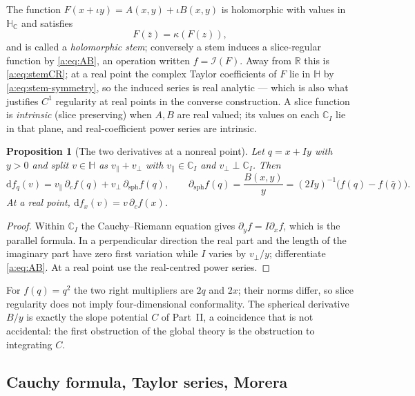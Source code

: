 \documentclass[11pt,a4paper]{article}
\numberwithin{equation}{section}
\newtheorem{proposition}[theorem]{Proposition}
\theoremstyle{definition}
\theoremstyle{remark}
\theoremstyle{plain}
\newcommand{\HH}{\mathbb H}
\newcommand{\HC}{\mathbb H_{\mathbb C}}
\newcommand{\RR}{\mathbb R}
\newcommand{\CC}{\mathbb C}
\newcommand{\I}{\mathcal I}
\newcommand{\pot}{C}          %
\newcommand{\dd}{\mathrm d}
\begin{document}
The function $F(x+\iota y)=A(x,y)+\iota B(x,y)$ is holomorphic with values in
$\HC$ and satisfies
\begin{equation}
 F(\bar z)=\kappa(F(z)),
 \label{a:eq:stem-symmetry}
\end{equation}
and is called a \emph{holomorphic stem}; conversely a stem induces a
slice-regular function by \eqref{a:eq:AB}, an operation written $f=\I(F)$.
Away from $\RR$ this is \eqref{a:eq:stemCR}; at a real point the complex
Taylor coefficients of $F$ lie in $\HH$ by \eqref{a:eq:stem-symmetry}, so the
induced series is real analytic --- which is also what justifies $C^1$
regularity at real points in the converse construction. A slice function is
\emph{intrinsic} (slice preserving) when $A,B$ are real valued; its values on
each $\CC_I$ lie in that plane, and real-coefficient power series are
intrinsic.

\begin{proposition}[The two derivatives at a nonreal point]
\label{a:prop:differential}
Let $q=x+Iy$ with $y>0$ and split $v\in\HH$ as $v_\parallel+v_\perp$ with
$v_\parallel\in\CC_I$ and $v_\perp\perp\CC_I$. Then
\begin{equation}
 \dd f_q(v)=v_\parallel\,\partial_cf(q)
  +v_\perp\,\partial_{\mathrm{sph}}f(q),
 \qquad
 \partial_{\mathrm{sph}}f(q)=\frac{B(x,y)}{y}
  =(2Iy)^{-1}\bigl(f(q)-f(\bar q)\bigr).
 \label{a:eq:differential}
\end{equation}
At a real point, $\dd f_x(v)=v\,\partial_cf(x)$.
\end{proposition}

\begin{proof}
Within $\CC_I$ the Cauchy--Riemann equation gives $\partial_yf=I\partial_xf$,
which is the parallel formula. In a perpendicular direction the real part and
the length of the imaginary part have zero first variation while $I$ varies by
$v_\perp/y$; differentiate \eqref{a:eq:AB}. At a real point use the
real-centred power series.
\end{proof}

For $f(q)=q^2$ the two right multipliers are $2q$ and $2x$; their norms differ,
so slice regularity does not imply four-dimensional conformality. The
spherical derivative $B/y$ is exactly the slope potential $\pot$ of
Part~II, a coincidence that is not accidental: the first obstruction of the
global theory is the obstruction to integrating $\pot$.

\subsection{Cauchy formula, Taylor series, Morera}
\label{a:sec:slice-cauchy}
\end{document}
